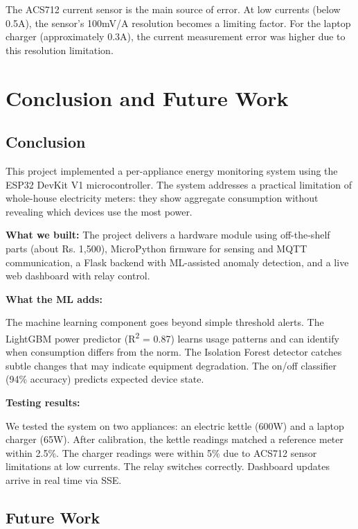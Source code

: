\documentclass[12pt, a4paper]{article}
\numberwithin{figure}{section}
\numberwithin{table}{section}
\begin{document}
	The ACS712 current sensor is the main source of error. At low currents (below 0.5A), the sensor's 100mV/A resolution becomes a limiting factor. For the laptop charger (approximately 0.3A), the current measurement error was higher due to this resolution limitation.
	
	\newpage
	
	\section{Conclusion and Future Work}\label{sec:conclusion}
	
	\subsection{Conclusion}
	
	This project implemented a per-appliance energy monitoring system using the ESP32 DevKit V1 microcontroller. The system addresses a practical limitation of whole-house electricity meters: they show aggregate consumption without revealing which devices use the most power.
	
	\textbf{What we built:} The project delivers a hardware module using off-the-shelf parts (about Rs. 1,500), MicroPython firmware for sensing and MQTT communication, a Flask backend with ML-assisted anomaly detection, and a live web dashboard with relay control.
	
	\textbf{What the ML adds:}
	
	The machine learning component goes beyond simple threshold alerts. The LightGBM power predictor (R\textsuperscript{2} = 0.87) learns usage patterns and can identify when consumption differs from the norm. The Isolation Forest detector catches subtle changes that may indicate equipment degradation. The on/off classifier (94\% accuracy) predicts expected device state.
	
	\textbf{Testing results:}
	
	We tested the system on two appliances: an electric kettle (600W) and a laptop charger (65W). After calibration, the kettle readings matched a reference meter within 2.5\%. The charger readings were within 5\% due to ACS712 sensor limitations at low currents. The relay switches correctly. Dashboard updates arrive in real time via SSE.
	
	\subsection{Future Work}
	
\end{document}
